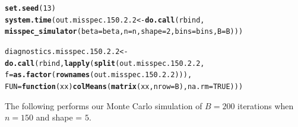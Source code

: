 \documentclass[11pt]{article}\usepackage[]{graphicx}\usepackage[]{color}
\makeatletter
\newcommand{\hlnum}[1]{\textcolor[rgb]{0.686,0.059,0.569}{#1}}%
\newcommand{\hlstd}[1]{\textcolor[rgb]{0.345,0.345,0.345}{#1}}%
\newcommand{\hlkwa}[1]{\textcolor[rgb]{0.161,0.373,0.58}{\textbf{#1}}}%
\newcommand{\hlkwb}[1]{\textcolor[rgb]{0.69,0.353,0.396}{#1}}%
\newcommand{\hlkwc}[1]{\textcolor[rgb]{0.333,0.667,0.333}{#1}}%
\newcommand{\hlkwd}[1]{\textcolor[rgb]{0.737,0.353,0.396}{\textbf{#1}}}%
\newenvironment{kframe}{%
 \def\at@end@of@kframe{}%
 \ifinner\ifhmode%
  \def\at@end@of@kframe{\end{minipage}}%
  \begin{minipage}{\columnwidth}%
 \fi\fi%
 \def\FrameCommand##1{\hskip\@totalleftmargin \hskip-\fboxsep
 \colorbox{shadecolor}{##1}\hskip-\fboxsep
     \hskip-\linewidth \hskip-\@totalleftmargin \hskip\columnwidth}%
 \MakeFramed {\advance\hsize-\width
   \@totalleftmargin\z@ \linewidth\hsize
   \@setminipage}}%
 {\par\unskip\endMakeFramed%
 \at@end@of@kframe}
\newenvironment{knitrout}{}{} %
\makeatother
\begin{document}
\begin{knitrout}
\color{fgcolor}\begin{kframe}
\begin{alltt}
\hlkwd{set.seed}\hlstd{(}\hlnum{13}\hlstd{)}
\hlkwd{system.time}\hlstd{(out.misspec.150.2.2} \hlkwb{<-} \hlkwd{do.call}\hlstd{(rbind,}
  \hlkwd{misspec_simulator}\hlstd{(}\hlkwc{beta} \hlstd{= beta,} \hlkwc{n} \hlstd{= n,} \hlkwc{shape} \hlstd{=} \hlnum{2}\hlstd{,} \hlkwc{bins} \hlstd{= bins,} \hlkwc{B} \hlstd{= B)))}
\end{alltt}


{\ttfamily\noindent\bfseries\color{errorcolor}{\#\# Error in chol.default(crossprod(x) + lambda[j] * diag(v)): the leading minor of order 5 is not positive definite}}

{\ttfamily\noindent\itshape\color{messagecolor}{\#\# Timing stopped at: 0.698 0 0.698}}\begin{alltt}
\hlstd{diagnostics.misspec.150.2.2} \hlkwb{<-} \hlkwd{do.call}\hlstd{(rbind,} \hlkwd{lapply}\hlstd{(}\hlkwd{split}\hlstd{(out.misspec.150.2.2,}
  \hlkwc{f} \hlstd{=} \hlkwd{as.factor}\hlstd{(}\hlkwd{rownames}\hlstd{(out.misspec.150.2.2))),}
  \hlkwc{FUN} \hlstd{=} \hlkwa{function}\hlstd{(}\hlkwc{xx}\hlstd{)} \hlkwd{colMeans}\hlstd{(}\hlkwd{matrix}\hlstd{(xx,} \hlkwc{nrow} \hlstd{= B),} \hlkwc{na.rm} \hlstd{=} \hlnum{TRUE}\hlstd{)))}
\end{alltt}


{\ttfamily\noindent\bfseries\color{errorcolor}{\#\# Error in split(out.misspec.150.2.2, f = as.factor(rownames(out.misspec.150.2.2))): object 'out.misspec.150.2.2' not found}}\end{kframe}
\end{knitrout}


The following performs our Monte Carlo simulation of $B = 200$ iterations 
when $n = 150$ and shape = $5$.
\end{document}
